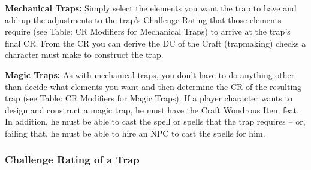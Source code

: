 \textbf{Mechanical Traps:} Simply select the elements you want the trap to have 
and add up the adjustments to the trap's Challenge Rating that those elements require 
(see Table: CR Modifiers for Mechanical Traps) to arrive at the trap's final CR. 
From the CR you can derive the DC of the Craft (trapmaking) checks a character 
must make to construct the trap.

\textbf{Magic Traps:} As with mechanical traps, you don't have to do anything other 
than decide what elements you want and then determine the CR of the resulting trap 
(see Table: CR Modifiers for Magic Traps). If a player character wants to design 
and construct a magic trap, he must have the Craft Wondrous Item feat. In addition, 
he must be able to cast the spell or spells that the trap requires -- or, failing 
that, he must be able to hire an NPC to cast the spells for him.

\subsubsection{Challenge Rating of a Trap}

